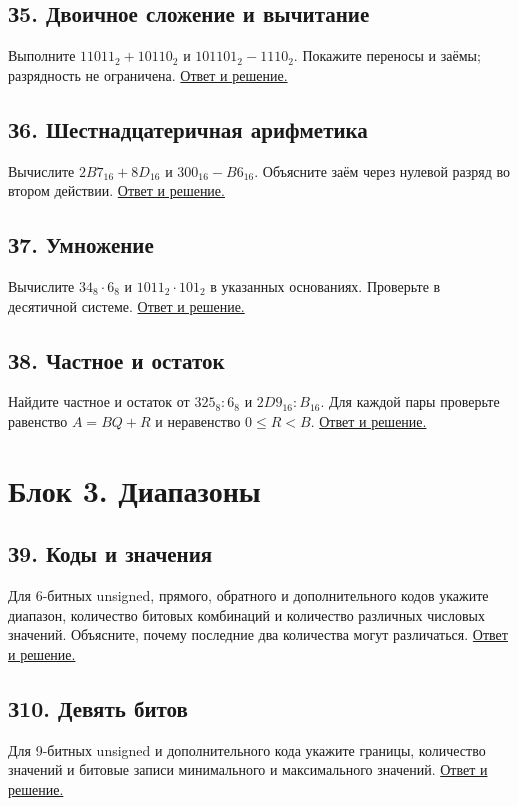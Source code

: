 \subsection*{З5. Двоичное сложение и вычитание}\label{task:z5}
Выполните $11011_2+10110_2$ и $101101_2-1110_2$. Покажите переносы и заёмы; разрядность не ограничена.
\hyperref[ans:z5]{Ответ и решение.}

\subsection*{З6. Шестнадцатеричная арифметика}\label{task:z6}
Вычислите $2B7_{16}+8D_{16}$ и $300_{16}-B6_{16}$. Объясните заём через нулевой разряд во втором действии.
\hyperref[ans:z6]{Ответ и решение.}

\subsection*{З7. Умножение}\label{task:z7}
Вычислите $34_8\cdot6_8$ и $1011_2\cdot101_2$ в указанных основаниях. Проверьте в десятичной системе.
\hyperref[ans:z7]{Ответ и решение.}

\subsection*{З8. Частное и остаток}\label{task:z8}
Найдите частное и остаток от $325_8:6_8$ и $2D9_{16}:B_{16}$. Для каждой пары проверьте равенство $A=BQ+R$ и неравенство $0\le R<B$.
\hyperref[ans:z8]{Ответ и решение.}

\section{Блок 3. Диапазоны}
\subsection*{З9. Коды и значения}\label{task:z9}
Для 6-битных unsigned, прямого, обратного и дополнительного кодов укажите диапазон, количество битовых комбинаций и количество различных числовых значений. Объясните, почему последние два количества могут различаться.
\hyperref[ans:z9]{Ответ и решение.}

\subsection*{З10. Девять битов}\label{task:z10}
Для 9-битных unsigned и дополнительного кода укажите границы, количество значений и битовые записи минимального и максимального значений.
\hyperref[ans:z10]{Ответ и решение.}

